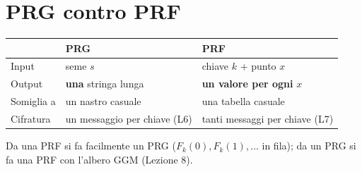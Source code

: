 \section{PRG contro PRF}

\begin{center}
\begin{tabular}{lll}
\toprule
 & PRG & PRF \\
\midrule
Input & seme \(s\) & chiave \(k\) + punto \(x\) \\
Output & \textbf{una} stringa lunga & \textbf{un valore per ogni} \(x\) \\
Somiglia a & un nastro casuale & una tabella casuale \\
Cifratura & un messaggio per chiave (L6) & tanti messaggi per chiave (L7) \\
\bottomrule
\end{tabular}
\end{center}

Da una PRF si fa facilmente un PRG (\(F_k(0), F_k(1), \dots\) in fila); da un PRG si fa una PRF con l'albero GGM (Lezione 8).
